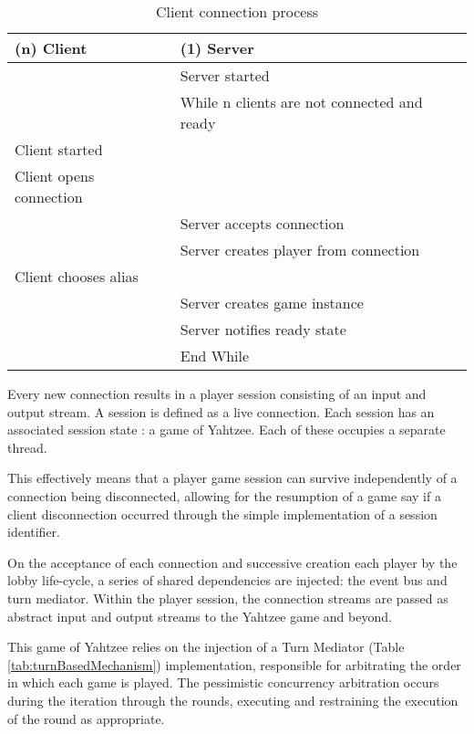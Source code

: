 \begin{table}[H]
	\centering
	\begin{tabular}{ | l | l | }
		\hline
		(n) Client & (1) Server \\
		\hline
		\hline
		 & Server started \\
		 \hline
		 & While n clients are not connected and ready \\
		 \hline
		 Client started  & \\
		 \hline
		Client opens connection & \\
		 \hline
		 & Server accepts connection \\
		 \hline
		 & Server creates player from connection  \\
		 \hline
		Client chooses alias & \\
		 \hline
		& Server creates game instance \\
		\hline
		& Server notifies ready state  \\
		 \hline
		& End While \\
		\hline
	\end{tabular}
	\caption{Client connection process}
	\label{tab:connectionProtocol}
\end{table}

Every new connection results in a player session consisting of an input and output stream. A session is defined as a live connection. Each session has an associated session state \parencite[page~456]{fowler2012patterns}: a game of Yahtzee. Each of these occupies a separate thread.

This effectively means that a player game session can survive independently of a connection being disconnected, allowing for the resumption of a game say if a client disconnection occurred through the simple implementation of a session identifier. \parencite[page~456]{fowler2012patterns}

On the acceptance of each connection and successive creation each player by the lobby life-cycle, a series of shared dependencies are injected: the event bus and turn mediator. Within the player session, the connection streams are passed as abstract input and output streams to the Yahtzee game and beyond.

This game of Yahtzee relies on the injection of a Turn Mediator \parencite{gamma1994design} (Table \ref{tab:turnBasedMechanism}) implementation, responsible for arbitrating the order in which each game is played. The pessimistic concurrency \parencite[page~67]{fowler2012patterns} arbitration occurs during the iteration through the rounds, executing and restraining the execution of the round as appropriate.

